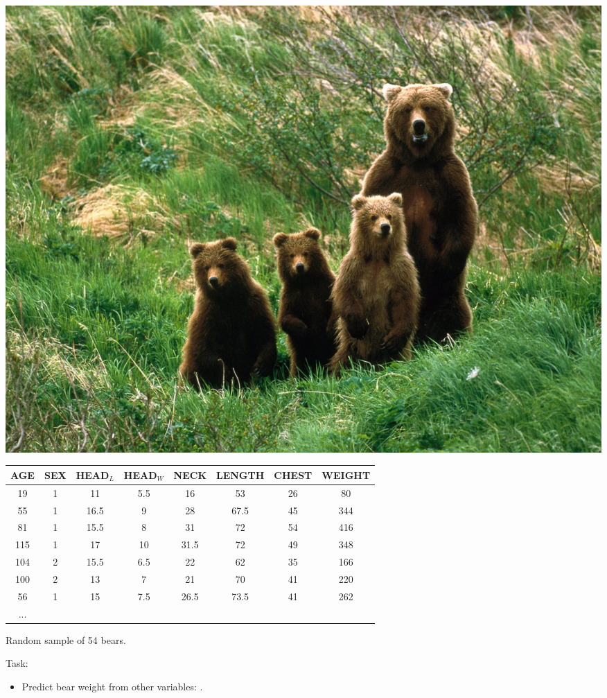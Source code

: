 \begin{frame}
\begin{analysis}

\smallskip

\begin{minipage}[c]{0.33\linewidth}
\includegraphics[width=1.0\linewidth]{../LectureAssets/L04/bear}
\end{minipage} 
\begin{minipage}[r]{0.65\linewidth}
\begin{tiny}
\tabcolsep=0.11cm
\hfill\begin{tabular}{cccccccc}
\hline
AGE	&  SEX & HEAD$_L$	& HEAD$_W$	& NECK	& LENGTH	& CHEST & \textbf{WEIGHT} \\
\hline
19	&  1	&11	  & 5.5	&16  &53    &26	& 80 \\
55	&  1	&16.5 &	9	&28  &67.5	&45 &	344\\
81	&  1	&15.5 &	8	&31	 &72	&54	&416\\
115	&  1	&17	  & 10	&31.5&72	&49 &	348\\
104	&  2	&15.5 &	6.5	&22	 &62	&35	&166\\
100	&  2	&13   &	7   &21	 &70	&41	&220\\
56	&  1 &	15&	7.5 &26.5&73.5  &41 &262\\
... \\
\hline
\hline
\end{tabular}
\end{tiny}
\end{minipage}

\bigskip

Random sample of 54 bears. 

\bigskip

Task:

\begin{itemize}
\item Predict bear weight from other variables: .
\end{itemize}

\bigskip

\end{analysis}
\end{frame}


